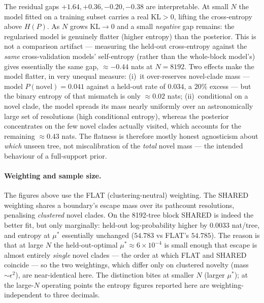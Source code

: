 \documentclass{article}
\newcommand{\KL}{\mathrm{KL}}
\newcommand{\eps}{\epsilon}
\begin{document}
The residual gaps $+1.64,+0.36,-0.20,-0.38$ are interpretable. At small $N$ the
model fitted on a training subset carries a real $\KL>0$, lifting the
cross-entropy above $H(P)$. As $N$ grows $\KL\to0$ and a small \emph{negative} gap
remains: the regularised model is genuinely flatter (higher entropy) than the
posterior. This is not a comparison artifact --- measuring the held-out
cross-entropy against the \emph{same} cross-validation models' self-entropy
(rather than the whole-block model's) gives essentially the same gap,
$\approx-0.44$ nats at $N=8192$. Two effects make the model flatter, in very
unequal measure: (i)~it over-reserves novel-clade mass --- model
$P(\text{novel})=0.041$ against a held-out rate of $0.034$, a $20\%$ excess --- but
the binary entropy of that mismatch is only $\approx0.02$ nats; (ii)~conditional on
a novel clade, the model spreads its mass nearly uniformly over an astronomically
large set of resolutions (high conditional entropy), whereas the posterior
concentrates on the few novel clades actually visited, which accounts for the
remaining $\approx0.43$ nats. The flatness is therefore mostly honest agnosticism
about \emph{which} unseen tree, not miscalibration of the \emph{total} novel mass
--- the intended behaviour of a full-support prior.

\paragraph{Weighting and sample size.}
The figures above use the FLAT (clustering-neutral) weighting. The SHARED weighting
shares a boundary's escape mass over its pathcount resolutions, penalising
\emph{clustered} novel clades. On the 8192-tree block SHARED is indeed the better
fit, but only marginally: held-out log-probability higher by $0.0033$ nat/tree, and
entropy at $\mu^{*}$ essentially unchanged ($54.783$ vs FLAT's $54.785$). The reason
is that at large $N$ the held-out-optimal $\mu^{*}\approx6\times10^{-4}$ is small
enough that escape is almost entirely \emph{single} novel clades --- the order at
which FLAT and SHARED coincide --- so the two weightings, which differ only on
clustered novelty (mass $\sim\eps^{2}$), are near-identical here. The distinction
bites at smaller $N$ (larger $\mu^{*}$); at the large-$N$ operating points the
entropy figures reported here are weighting-independent to three decimals.
\end{document}
